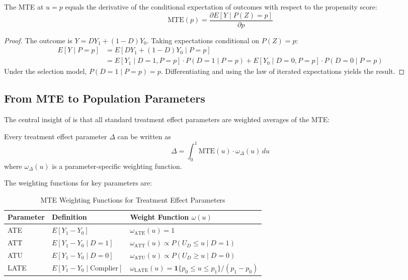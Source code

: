 \begin{theorem}
\label{thm:mte-local-iv}
The MTE at $u = p$ equals the derivative of the conditional expectation of outcomes with respect to the propensity score:
\begin{equation}
\text{MTE}(p) = \frac{\partial E[Y \mid P(Z) = p]}{\partial p}
\end{equation}
\end{theorem}

\begin{proof}
The outcome is $Y = DY_1 + (1-D)Y_0$. Taking expectations conditional on $P(Z) = p$:
\begin{align}
E[Y \mid P = p] &= E[DY_1 + (1-D)Y_0 \mid P = p] \\
&= E[Y_1 \mid D=1, P=p] \cdot P(D=1 \mid P=p) + E[Y_0 \mid D=0, P=p] \cdot P(D=0 \mid P=p)
\end{align}
Under the selection model, $P(D=1 \mid P=p) = p$. Differentiating and using the law of iterated expectations yields the result.
\end{proof}

\subsection{From MTE to Population Parameters}

The central insight of \citet{heckman2005structural} is that all standard treatment effect parameters are weighted averages of the MTE:

\begin{theorem}
\label{thm:weighted-avg}
Every treatment effect parameter $\Delta$ can be written as
\begin{equation}
\Delta = \int_0^1 \text{MTE}(u) \cdot \omega_\Delta(u) \, du
\end{equation}
where $\omega_\Delta(u)$ is a parameter-specific weighting function.
\end{theorem}

The weighting functions for key parameters are:

\begin{table}[htbp]
\centering
\caption{MTE Weighting Functions for Treatment Effect Parameters}
\label{tab:mte-weights}
\begin{tabular}{lll}
\toprule
Parameter & Definition & Weight Function $\omega(u)$ \\
\midrule
ATE & $E[Y_1 - Y_0]$ & $\omega_{\text{ATE}}(u) = 1$ \\
ATT & $E[Y_1 - Y_0 \mid D=1]$ & $\omega_{\text{ATT}}(u) \propto P(U_D \leq u \mid D=1)$ \\
ATU & $E[Y_1 - Y_0 \mid D=0]$ & $\omega_{\text{ATU}}(u) \propto P(U_D \geq u \mid D=0)$ \\
LATE & $E[Y_1 - Y_0 \mid \text{Complier}]$ & $\omega_{\text{LATE}}(u) = \mathbf{1}\{p_0 \leq u \leq p_1\}/(p_1 - p_0)$ \\
\bottomrule
\end{tabular}
\end{table}

